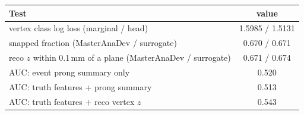 \begin{tabular}{lc}
\toprule
Test & value \\
\midrule
vertex class log loss (marginal / head) & 1.5985 / 1.5131 \\
snapped fraction (MasterAnaDev / surrogate) & 0.670 / 0.671 \\
reco $z$ within 0.1\,mm of a plane (MasterAnaDev / surrogate) & 0.671 / 0.674 \\
\midrule
AUC: event prong summary only & 0.520 \\
AUC: truth features + prong summary & 0.513 \\
AUC: truth features + reco vertex $z$ & 0.543 \\
\bottomrule
\end{tabular}
